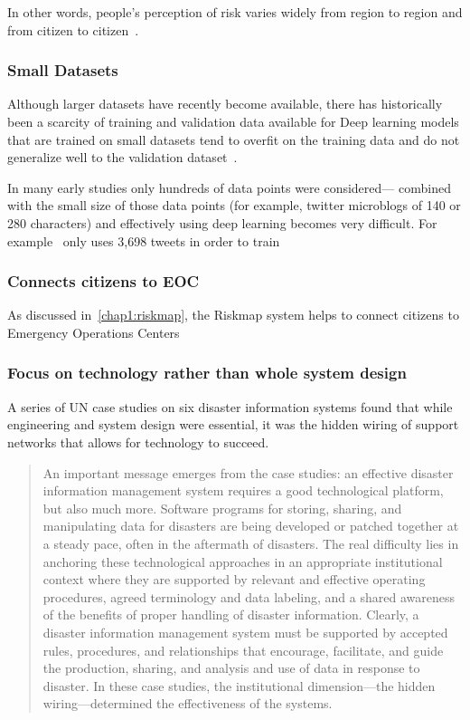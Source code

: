 In other words, people's perception of risk varies widely from region to region
and from citizen to citizen~\cite{quarantelliUrbanVulnerabilityDisasters2003}.

\subsubsection{Small Datasets}
Although larger datasets have recently become available, there has
historically been a scarcity of training and validation data available for
Deep learning models that are trained on small datasets tend to overfit on the
training data and do not generalize well to the validation
dataset~\cite{perezEffectivenessDataAugmentation2017}.

In many early studies only hundreds of data points were considered--- combined
with the small size of those data points (for example, twitter microblogs of
140 or 280 characters) and effectively using deep learning becomes very
difficult.
For example~\cite{nagyCrowdSentimentDetection2012} only uses 3,698 tweets in
order to train 

\subsubsection{Connects citizens to EOC}
As discussed in~\ref{chap1:riskmap}, the Riskmap system helps to connect
citizens to Emergency Operations Centers

\subsubsection{Focus on technology rather than whole system design}
A series of UN case studies on six disaster information systems found that while
engineering and system design were essential, it was the hidden wiring of support
networks that allows for technology to succeed.

\begin{quote}
An important message emerges from the case studies: an effective disaster
information management system requires a good technological platform,
but also much more. Software programs for storing, sharing, and manipulating
data for disasters are being developed or patched together at a steady pace,
often in the aftermath of disasters. The real difficulty lies in anchoring
these technological approaches in an appropriate institutional context where
they are supported by relevant and effective operating procedures, agreed
terminology and data labeling, and a shared awareness of the benefits of proper
handling of disaster information. Clearly, a disaster information management
system must be supported by accepted rules, procedures, and relationships
that encourage, facilitate, and guide the production, sharing, and analysis and
use of data in response to disaster. In these case studies, the institutional
dimension---the hidden wiring---determined the effectiveness of the
systems.~\cite{aminDataNaturalDisasters2008}
\end{quote}

